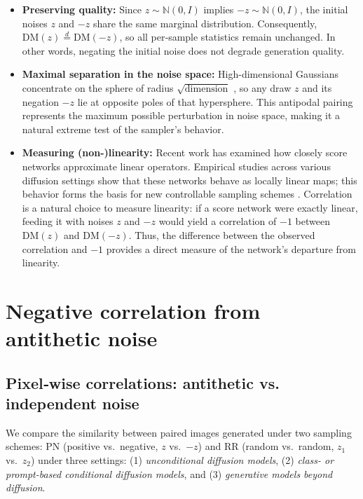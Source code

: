 \documentclass[12pt]{article}
\newcommand{\0}{\mathbf{0}}
\newcommand{\bN}{\mathbb{N}}
\newcommand{\DM}{\text{DM}}
\begin{document}
\begin{itemize}[leftmargin = *]
    \item \textbf{Preserving quality:} Since $z\sim\bN(0,I)$ implies $-z\sim\bN(0,I)$, the initial noises $z$ and $-z$ share the same marginal distribution. Consequently, $\DM(z)\overset{d}{=}\DM(-z)$,
so all per‐sample statistics remain unchanged. In other words, negating the initial noise does not degrade generation quality.

\item \textbf{Maximal separation in the noise space:}
High-dimensional Gaussians concentrate on the sphere of radius $\sqrt {\text{dimension}}$ \citep{vershynin2018high}, so any draw $z$ and its negation $-z$ lie at opposite poles of that hypersphere.  This antipodal pairing represents the maximum possible perturbation in noise space, making it a natural extreme test of the sampler’s behavior.

\item \textbf{Measuring (non-)linearity:} Recent work has examined how closely score networks approximate linear operators. Empirical studies across various diffusion settings show that these networks behave  as locally linear maps; this behavior forms the basis for new controllable sampling schemes \citep{chen2024exploring,li2024understanding,song2025ccs}. Correlation is a natural choice to measure linearity: if a  score network were exactly linear, feeding it with noises $z$ and $-z$ would yield a correlation of $-1$ between $\DM(z)$ and $\DM(-z)$. Thus, the difference between the observed correlation and $-1$ provides a direct measure of the network’s departure from linearity.

\end{itemize}




\section{Negative correlation from antithetic noise}\label{sec:negative correlation}


\subsection{Pixel‐wise correlations: antithetic vs. independent noise}\label{subec:pixel-wise correlation}

We compare the similarity between paired images generated under two sampling schemes: PN (positive vs.\ negative, $z$ vs.\ $-z$) and RR (random vs.\ random, $z_1$ vs.\ $z_2$) under three settings: (1) \emph{unconditional diffusion models}, (2) \emph{class- or prompt-based conditional diffusion models}, and (3) \emph{generative models beyond diffusion}. 
\end{document}
